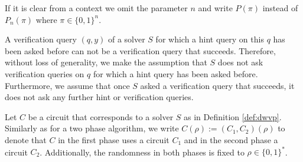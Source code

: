 %
If it is clear from a context we omit the parameter $n$ and write $P(\pi)$ instead of $P_n(\pi)$ where $\pi \in \{0,1\}^{n}$.

A verification query $(q,y)$ of a solver $S$ for which a hint query on this $q$ has been asked before can not be a verification query that succeeds.
Therefore, without loss of generality, we make the assumption that $S$ does not ask verification queries on $q$
for which a hint query has been asked before. Furthermore, we assume that once $S$ asked a verification query that succeeds,
it does not ask any further hint or verification queries.

Let $C$ be a circuit that corresponds to a solver $S$ as in Definition \ref{def:dwvp}.
Similarly as for a two phase algorithm, we write $C(\rho) := (C_1, C_2)(\rho)$ to denote that $C$
in the first phase uses a circuit $C_1$ and in the second phase a circuit $C_2$.
Additionally, the randomness in both phases is fixed to $\rho \in \{0,1\}^{*}$.

